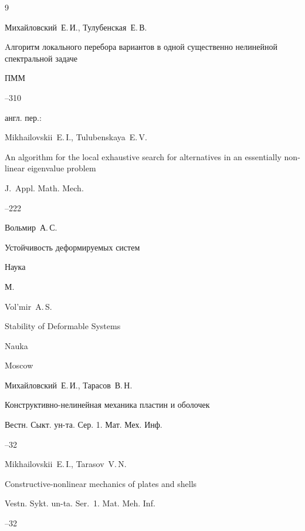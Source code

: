 \begin{thebibliography}{9}




\by Михайловский~Е.\,И., Тулубенская~Е.\,В.

\paper Aлгоритм локального перебора вариантов в одной существенно нелинейной спектральной задаче

\jour ПММ




--310

\transl англ. пер.:~

\by Mikhailovskii~E.\,I., Tulubenskaya~E.\,V.

\paper An algorithm for the local exhaustive search for alternatives in an essentially non-linear eigenvalue problem

\jour J.~Appl. Math. Mech.




–222 




\by Вольмир~А.\,С.

\book Устойчивость деформируемых систем


\publ Наука

\publaddr М.


\misctransl

\by Vol'mir~A.\,S.

\book Stability of Deformable Systems 

\publ Nauka

\publaddr Moscow 






\by Михайловский~Е.\,И., Тарасов~В.\,Н.

\paper Конструктивно-нелинейная механика пластин и оболочек

\jour Вестн. Сыкт. ун-та. Сер. 1. Мат. Мех. Инф.



--32

\misctransl 

\by Mikhailovskii~E.\,I., Tarasov~V.\,N.

\paper Constructive-nonlinear mechanics of plates and shells

\jour Vestn. Sykt. un-ta. Ser.~1. Mat. Meh. Inf.



--32



\end{thebibliography}



